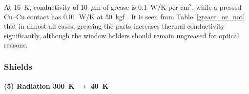 At 16~K, conductivity of 10~$\mu$m of grease is 0.1~W/K per cm$^2$, while a
pressed Cu--Cu contact has 0.01~W/K at 50~kgf
\cite[Fig.~2.7]{ekin2006experimental}. It is seen from Table~\ref{grease_or_not}
that in almost all cases, greasing the parts increases thermal conductivity
significantly, although the window holders should remain ungreased for optical
reasons.

\begin{table}
    \caption[Thermal joints in the components of the cell assembly.]{Thermal
    joints in the components of the cell assembly. $A$ is the common surface
    area, $N$ is the number of \#4-40 fasteners used, $F$ is the force assuming
    a safety factor of 2, $c_1$ is the thermal conductance of a copper--copper
    joint at 16~K, $c_2$ is the same for a greased joint using Apiezon-N.}
    \label{grease_or_not}
\end{table}

\subsubsection{Shields}

\paragraph{(5) Radiation 300~K $\rightarrow$ 40~K}

